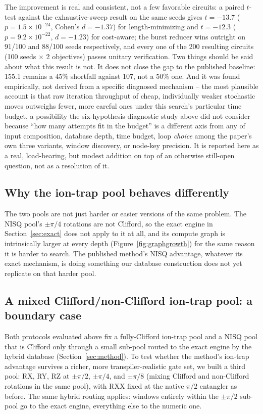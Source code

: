 \documentclass[11pt]{article}
\begin{document}
The improvement is real and consistent, not a few favorable circuits: a
paired $t$-test against the exhaustive-sweep result on the same seeds
gives $t=-13.7$ ($p=1.5\times10^{-24}$, Cohen's $d=-1.37$) for
length-minimizing and $t=-12.3$ ($p=9.2\times10^{-22}$, $d=-1.23$) for
cost-aware; the burst reducer wins outright on 91/100 and 88/100 seeds
respectively, and every one of the 200 resulting circuits (100 seeds
$\times$ 2 objectives) passes unitary verification. Two things should be
said about what this result is not. It does not close the gap to the
published baseline: 155.1 remains a $45\%$ shortfall against 107, not a
$50\%$ one. And it was found empirically, not derived from a specific
diagnosed mechanism -- the most plausible account is that raw iteration
throughput of cheap, individually weaker stochastic moves outweighs fewer,
more careful ones under this search's particular time budget, a
possibility the six-hypothesis diagnostic study above did not consider
because ``how many attempts fit in the budget'' is a different axis from
any of input composition, database depth, time budget, loop \emph{choice}
among the paper's own three variants, window discovery, or node-key
precision. It is reported here as a real, load-bearing, but modest
addition on top of an otherwise still-open question, not as a resolution
of it.

\subsection{Why the ion-trap pool behaves differently}

The two pools are not just harder or easier versions of the same problem.
The NISQ pool's $\pm\pi/4$ rotations are not Clifford, so the exact
engine in Section~\ref{sec:exact} does not apply to it at all, and its
compute graph is intrinsically larger at every depth
(Figure~\ref{fig:graphgrowth}) for the same reason it is harder to
search. The published method's NISQ advantage, whatever its exact
mechanism, is doing something our database construction does not yet
replicate on that harder pool.

\subsection{A mixed Clifford/non-Clifford ion-trap pool: a boundary case}
\label{sec:mixed-ion}

Both protocols evaluated above fix a fully-Clifford ion-trap pool and a
NISQ pool that is Clifford only through a small sub-pool routed to the
exact engine by the hybrid database (Section~\ref{sec:method}). To test
whether the method's ion-trap advantage survives a richer, more
transpiler-realistic gate set, we built a third pool: RX, RY, RZ at
$\pm\pi/2$, $\pm\pi/4$, and $\pm\pi/8$ (mixing Clifford and non-Clifford
rotations in the same pool), with RXX fixed at the native $\pi/2$
entangler as before. The same hybrid routing applies: windows entirely
within the $\pm\pi/2$ sub-pool go to the exact engine, everything else to
the numeric one.
\end{document}
